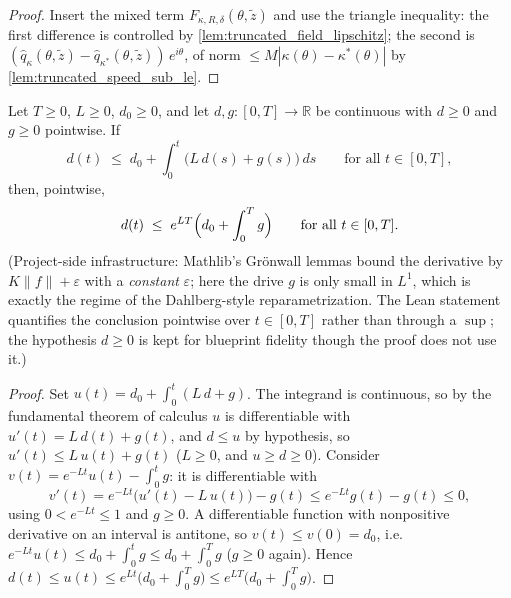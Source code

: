 \begin{proof}

\leanok
  Insert the mixed term $F_{\kappa,R,\delta}(\theta,\tilde z)$ and use the triangle
  inequality: the first difference is controlled by
  \cref{lem:truncated_field_lipschitz}; the second is
  $(\hat q_{\kappa}(\theta,\tilde z)-\hat q_{\kappa^\ast}(\theta,\tilde z))\,e^{i\theta}$,
  of norm $\le M|\kappa(\theta)-\kappa^\ast(\theta)|$ by
  \cref{lem:truncated_speed_sub_le}.
\end{proof}

\begin{lemma}
  \label{lem:gronwall_L1_drive}
  Let $T\ge0$, $L\ge0$, $d_0\ge0$, and let $d,g:[0,T]\to\mathbb R$ be continuous with
  $d\ge0$ and $g\ge0$ pointwise. If
  \[
    d(t)\;\le\;d_0+\int_0^t\bigl(L\,d(s)+g(s)\bigr)\,ds
    \qquad\text{for all }t\in[0,T],
  \]
  then, pointwise,
  \[
    d(t)\;\le\;e^{LT}\Bigl(d_0+\int_0^T g\Bigr)\qquad\text{for all }t\in[0,T] .
  \]
  (Project-side infrastructure: Mathlib's Gr\"onwall lemmas bound the derivative by
  $K\|f\|+\varepsilon$ with a \emph{constant} $\varepsilon$; here the drive $g$ is only
  small in $L^1$, which is exactly the regime of the Dahlberg-style reparametrization.
  The Lean statement quantifies the conclusion pointwise over $t\in[0,T]$ rather than
  through a $\sup$; the hypothesis $d\ge0$ is kept for blueprint fidelity though the
  proof does not use it.)
\end{lemma}

\begin{proof}

\leanok
  Set $u(t)=d_0+\int_0^t(L\,d+g)$. The integrand is continuous, so by the fundamental
  theorem of calculus $u$ is differentiable with $u'(t)=L\,d(t)+g(t)$, and $d\le u$ by
  hypothesis, so $u'(t)\le L\,u(t)+g(t)$ ($L\ge0$, and $u\ge d\ge0$). Consider
  $v(t)=e^{-Lt}u(t)-\int_0^t g$: it is differentiable with
  \[
    v'(t)=e^{-Lt}\bigl(u'(t)-L\,u(t)\bigr)-g(t)\le e^{-Lt}g(t)-g(t)\le0,
  \]
  using $0<e^{-Lt}\le1$ and $g\ge0$. A differentiable function with nonpositive
  derivative on an interval is antitone, so $v(t)\le v(0)=d_0$, i.e.
  $e^{-Lt}u(t)\le d_0+\int_0^t g\le d_0+\int_0^T g$ ($g\ge0$ again). Hence
  $d(t)\le u(t)\le e^{Lt}\bigl(d_0+\int_0^T g\bigr)\le e^{LT}\bigl(d_0+\int_0^T g\bigr)$.
\end{proof}

